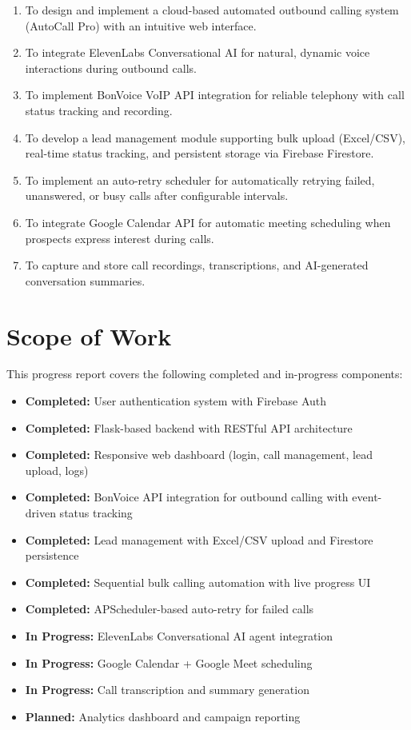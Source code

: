\documentclass[12pt,a4paper,oneside]{book}
\begin{document}
\begin{enumerate}
    \item To design and implement a cloud-based automated outbound calling system (AutoCall Pro) with an intuitive web interface.
    \item To integrate ElevenLabs Conversational AI for natural, dynamic voice interactions during outbound calls.
    \item To implement BonVoice VoIP API integration for reliable telephony with call status tracking and recording.
    \item To develop a lead management module supporting bulk upload (Excel/CSV), real-time status tracking, and persistent storage via Firebase Firestore.
    \item To implement an auto-retry scheduler for automatically retrying failed, unanswered, or busy calls after configurable intervals.
    \item To integrate Google Calendar API for automatic meeting scheduling when prospects express interest during calls.
    \item To capture and store call recordings, transcriptions, and AI-generated conversation summaries.
\end{enumerate}

\section{Scope of Work}

This progress report covers the following completed and in-progress components:

\begin{itemize}
    \item[\checkmark] \textbf{Completed:} User authentication system with Firebase Auth
    \item[\checkmark] \textbf{Completed:} Flask-based backend with RESTful API architecture
    \item[\checkmark] \textbf{Completed:} Responsive web dashboard (login, call management, lead upload, logs)
    \item[\checkmark] \textbf{Completed:} BonVoice API integration for outbound calling with event-driven status tracking
    \item[\checkmark] \textbf{Completed:} Lead management with Excel/CSV upload and Firestore persistence
    \item[\checkmark] \textbf{Completed:} Sequential bulk calling automation with live progress UI
    \item[\checkmark] \textbf{Completed:} APScheduler-based auto-retry for failed calls
    \item[$\circ$] \textbf{In Progress:} ElevenLabs Conversational AI agent integration
    \item[$\circ$] \textbf{In Progress:} Google Calendar + Google Meet scheduling
    \item[$\circ$] \textbf{In Progress:} Call transcription and summary generation
    \item[$\circ$] \textbf{Planned:} Analytics dashboard and campaign reporting
\end{itemize}
\end{document}
